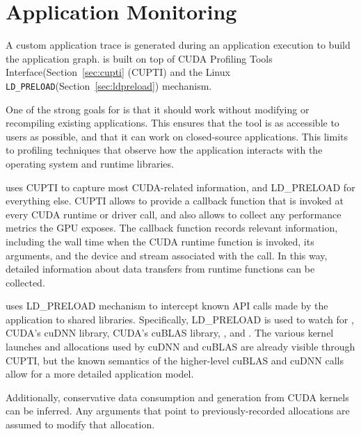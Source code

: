\section{Application Monitoring}

A custom application trace is generated during an application execution to build the application graph.
 is built on top of CUDA Profiling Tools Interface(Section~\ref{sec:cupti} (CUPTI) and the Linux \texttt{LD\_PRELOAD}(Section~\ref{sec:ldpreload}) mechanism.

One of the strong goals for  is that it should work without modifying or recompiling existing applications.
This ensures that the tool is as accessible to users as possible, and that it can work on closed-source applications.
This limits  to profiling techniques that observe how the application interacts with the operating system and runtime libraries.

 uses CUPTI to capture most CUDA-related information, and LD\_PRELOAD for everything else.
CUPTI allows  to provide a callback function that is invoked at every CUDA runtime or driver call, and also allows  to collect any performance metrics the GPU exposes.
The callback function records relevant information, including the wall time when the CUDA runtime function is invoked, its arguments, and the device and stream associated with the call.
In this way, detailed information about data transfers from runtime functions can be collected.



 uses LD\_PRELOAD mechanism to intercept known API calls made by the application to shared libraries.
Specifically, LD\_PRELOAD is used to watch for , CUDA's cuDNN library, CUDA's cuBLAS library, , and .
The various kernel launches and allocations used by cuDNN and cuBLAS are already visible through CUPTI, but the known semantics of the higher-level cuBLAS and cuDNN calls allow for a more detailed application model.


Additionally, conservative data consumption and generation from CUDA kernels can be inferred.
Any arguments that point to previously-recorded allocations are assumed to modify that allocation.

